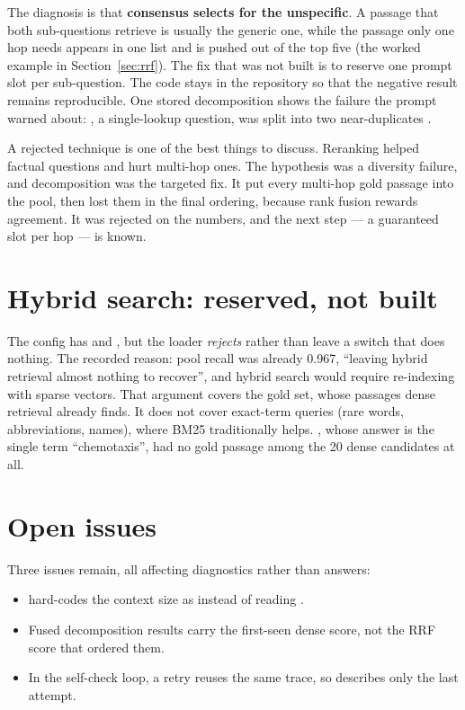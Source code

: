 The diagnosis is that \textbf{consensus selects for the unspecific}. A passage that both sub-questions retrieve is usually the generic one, while the passage only one hop needs appears in one list and is pushed out of the top five (the worked example in Section~\ref{sec:rrf}). The fix that was not built is to reserve one prompt slot per sub-question. The code stays in the repository so that the negative result remains reproducible. One stored decomposition shows the failure the prompt warned about: , a single-lookup question, was split into two near-duplicates \tagM.

\begin{interview}
A rejected technique is one of the best things to discuss. Reranking helped factual questions and hurt multi-hop ones. The hypothesis was a diversity failure, and decomposition was the targeted fix. It put every multi-hop gold passage into the pool, then lost them in the final ordering, because rank fusion rewards agreement. It was rejected on the numbers, and the next step --- a guaranteed slot per hop --- is known.
\end{interview}

\section{Hybrid search: reserved, not built}

The config has  and , but the loader \emph{rejects}  rather than leave a switch that does nothing. The recorded reason: pool recall was already 0.967, ``leaving hybrid retrieval almost nothing to recover'', and hybrid search would require re-indexing with sparse vectors. \tagI{} That argument covers the gold set, whose passages dense retrieval already finds. It does not cover exact-term queries (rare words, abbreviations, names), where BM25 traditionally helps. , whose answer is the single term ``chemotaxis'', had no gold passage among the 20 dense candidates at all.

\section{Open issues}

Three issues remain, all affecting diagnostics rather than answers:
\begin{itemize}
  \item {} hard-codes the context size as  instead of reading .
  \item Fused decomposition results carry the first-seen dense score, not the RRF score that ordered them.
  \item In the self-check loop, a retry reuses the same trace, so  describes only the last attempt.
\end{itemize}
